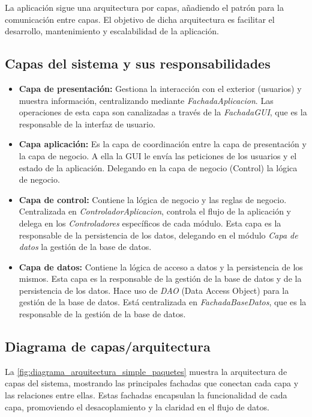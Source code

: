 La aplicación sigue una arquitectura por capas, añadiendo el patrón  para la comunicación entre capas.
El objetivo de dicha arquitectura es facilitar el desarrollo, mantenimiento y escalabilidad de la aplicación.

\subsection{Capas del sistema y sus responsabilidades}\label{subsec:capas-del-sistema}
\begin{itemize}
    \item \textbf{Capa de presentación:} Gestiona la interacción con el exterior (usuarios) y muestra información, centralizando mediante \textit{FachadaAplicacion}.
    Las operaciones de esta capa son canalizadas a través de la \textit{FachadaGUI}, que es la responsable de la interfaz de usuario.
    \item \textbf{Capa aplicación:} Es la capa de coordinación entre la capa de presentación y la capa de negocio.
    A ella la GUI le envía las peticiones de los usuarios y el estado de la aplicación.
    Delegando en la capa de negocio (Control) la lógica de negocio.
    \item \textbf{Capa de control:} Contiene la lógica de negocio y las reglas de negocio.
    Centralizada en \textit{ControladorAplicacion}, controla el flujo de la aplicación y delega en los \textit{Controladores} específicos de cada módulo.
    Esta capa es la responsable de la persistencia de los datos, delegando en el módulo \textit{Capa de datos} la gestión de la base de datos.
    \item{\textbf{Capa de datos:}} Contiene la lógica de acceso a datos y la persistencia de los mismos.
    Esta capa es la responsable de la gestión de la base de datos y de la persistencia de los datos.
    Hace uso de \textit{DAO} (Data Access Object) para la gestión de la base de datos.
    Está centralizada en \textit{FachadaBaseDatos}, que es la responsable de la gestión de la base de datos.
\end{itemize}

\subsection{Diagrama de capas/arquitectura}\label{subsec:diagrama-de-capas}
La \autoref{fig:diagrama_arquitectura_simple_paquetes} muestra la arquitectura de capas del sistema, mostrando las principales fachadas que conectan cada capa y las relaciones entre ellas.
Estas fachadas encapsulan la funcionalidad de cada capa, promoviendo el desacoplamiento y la claridad en el flujo de datos.

